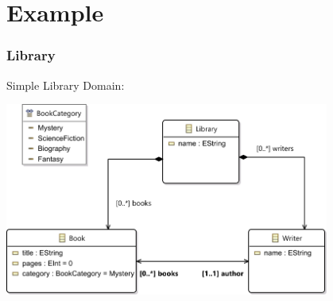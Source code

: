 \section{Example}
\begin{frame}
\frametitle{Library}
Simple Library Domain:\\
\begin{center}
\includegraphics[width=0.8\textwidth]{images/library_mm}
  \end{center}
\end{frame}
